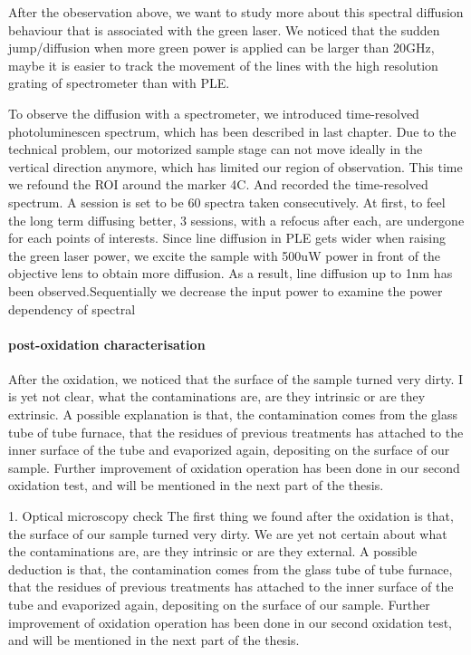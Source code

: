 After the obeservation above, we want to study more about this spectral diffusion behaviour that is associated with the green laser. We noticed that the sudden jump/diffusion when more green power is applied can be larger than 20GHz, maybe it is easier to track the movement of the lines with the high resolution grating of spectrometer than with PLE.

To observe the diffusion with a spectrometer, we introduced time-resolved photoluminescen spectrum, which has been described in last chapter. Due to the technical problem, our motorized sample stage can not move ideally in the vertical direction anymore, which has limited our region of observation. This time we refound the ROI around the marker 4C. And recorded the time-resolved spectrum. A session is set to be 60 spectra taken consecutively. At first, to feel the long term diffusing better, 3 sessions, with a refocus after each, are undergone for each points of interests. Since line diffusion in PLE gets wider when raising the green laser power, we excite the sample with 500uW power in front of the objective lens to obtain more diffusion. As a result, line diffusion up to 1nm has been observed.Sequentially we decrease the input power to examine the power dependency of spectral

\paragraph{post-oxidation characterisation}

After the oxidation, we noticed that the surface of the sample turned very dirty. I is yet not clear, what the contaminations are, are they intrinsic or are they extrinsic. A possible explanation is that, the contamination comes from the glass tube of tube furnace, that the residues of previous treatments has attached to the inner surface of the tube and evaporized again, depositing on the surface of our sample. Further improvement of oxidation operation has been done in our second oxidation test, and will be mentioned in the next part of the thesis.

1. Optical microscopy check
The first thing we found after the oxidation is that, the surface of our sample turned very dirty. We are yet not certain about what the contaminations are, are they intrinsic or are they external. A possible deduction is that, the contamination comes from the glass tube of tube furnace, that the residues of previous treatments has attached to the inner surface of the tube and evaporized again, depositing on the surface of our sample. Further improvement of oxidation operation has been done in our second oxidation test, and will be mentioned in the next part of the thesis.


